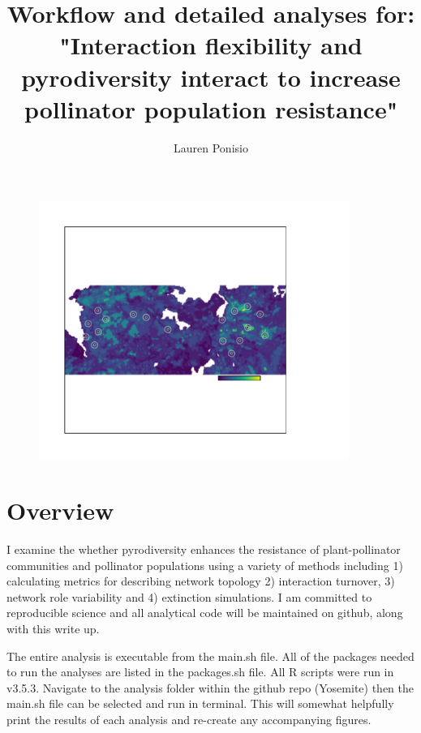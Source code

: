\documentclass{article}\usepackage[]{graphicx}\usepackage[]{color}
\begin{document}
\title{Workflow and detailed analyses for: "Interaction flexibility and pyrodiversity interact to increase pollinator population resistance"}
\author{Lauren Ponisio}
\maketitle

\begin{figure}[h!]
  \centering
  \includegraphics[width=0.9\textwidth]{figure/pyrodiv.pdf}
  \label{fig:pyrodiv}
\end{figure}
\clearpage

\section{Overview}
\label{sec:overview}

I examine the whether pyrodiversity enhances the resistance of
plant-pollinator communities and pollinator populations using a
variety of methods including 1) calculating metrics for describing
network topology 2) interaction turnover, 3) network role variability
and 4) extinction simulations. I am committed to reproducible science
and all analytical code will be maintained on github, along with this
write up.

The entire analysis is executable from the main.sh file. All of the
packages needed to run the analyses are listed in the packages.sh
file. All R scripts were run in v3.5.3. Navigate to the analysis
folder within the github repo (Yosemite) then the main.sh file can be
selected and run in terminal. This will somewhat helpfully print the
results of each analysis and re-create any accompanying figures.
\end{document}
